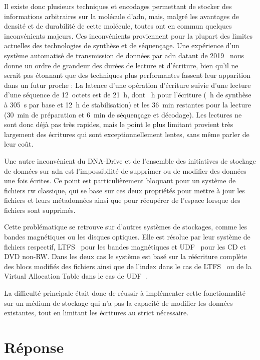 \documentclass[a4paper]{report}
\makeatletter
\newcommand{\ltfs}{LTFS~\cite{pease2010linear}\@\xspace}
\newcommand{\udf}{UDF~\cite{optical2003universal}\@\xspace}
\makeatother
\begin{document}
Il existe donc plusieurs techniques et encodages permettant
de stocker des informations arbitraires sur la molécule d'\ac{adn},
mais, malgré les avantages de densité et de durabilité de cette molécule,
toutes ont en commun quelques inconvénients majeurs.
Ces inconvénients proviennent pour la plupart des limites actuelles
des technologies de synthèse et de séquençage.
Une expérience d'un système automatisé de transmission de données par \ac{adn} datant de 2019~\cite{takahashi2019demonstration}
nous donne un ordre de grandeur des durées de lecture et d'écriture,
bien qu'il ne serait pas étonnant que des techniques plus performantes fassent leur apparition dans un futur proche :
La latence d'une opération d'écriture suivie d'une lecture d'une séquence de 12~octets est de 21~h,
dont ~h pour l'écriture (~h de synthèse à 305~s par base et 12~h de stabilisation)
et les 36~min restantes pour la lecture (30~min de préparation et 6~min de séquençage et décodage).
Les lectures ne sont donc déjà pas très rapides,
mais le point le plus limitant provient très largement des écritures
qui sont exceptionnellement lentes, sans même parler de leur coût.

Une autre inconvénient du DNA-Drive et de l'ensemble des initiatives
de stockage de données sur \ac{adn} est l'impossibilité de supprimer
ou de modifier des données une fois écrites.
Ce point est particulièrement bloquant pour un système de fichiers \ac{rw} classique,
qui se base sur ces deux propriétés pour mettre à jour les fichiers et leurs métadonnées
ainsi que pour récupérer de l'espace lorsque des fichiers sont supprimés.

Cette problématique se retrouve sur d'autres systèmes de stockages,
comme les bandes magnétiques ou les disques optiques.
Elle est résolue par leur système de fichiers respectif,
\ltfs pour les bandes magnétiques et \udf pour les CD et DVD non-RW.
Dans les deux cas le système est basé sur la réécriture complète des blocs modifiés des fichiers
ainsi que de l'index dans le cas de \ltfs ou de la Virtual Allocation Table dans le cas de \udf.

La difficulté principale était donc de réussir à implémenter cette fonctionnalité
sur un médium de stockage qui n'a pas la capacité de modifier les données existantes,
tout en limitant les écritures au strict nécessaire.


\section{Réponse}
\end{document}
